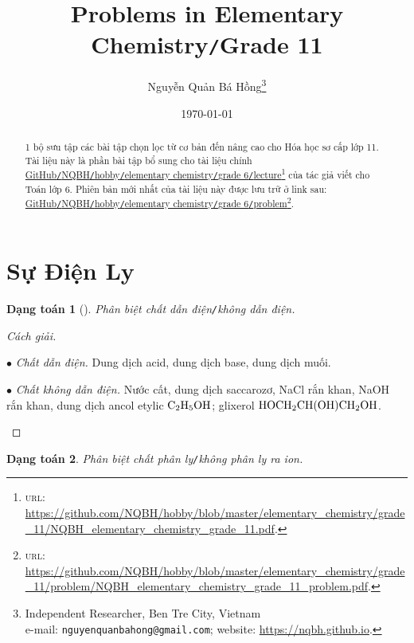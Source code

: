 \documentclass{article}
\title{Problems in Elementary Chemistry\texttt{/}Grade 11}
\author{Nguyễn Quản Bá Hồng\footnote{Independent Researcher, Ben Tre City, Vietnam\\e-mail: \texttt{nguyenquanbahong@gmail.com}; website: \url{https://nqbh.github.io}.}}
\date{\today}
\numberwithin{equation}{section}
\newtheorem{dangtoan}{Dạng toán}[section]
\begin{document}
\maketitle
\begin{abstract}
	1 bộ sưu tập các bài tập chọn lọc từ cơ bản đến nâng cao cho Hóa học sơ cấp lớp 11. Tài liệu này là phần bài tập bổ sung cho tài liệu chính \href{https://github.com/NQBH/hobby/blob/master/elementary_chemistry/grade_11/NQBH_elementary_chemistry_grade_11.pdf}{GitHub\texttt{/}NQBH\texttt{/}hobby\texttt{/}elementary chemistry\texttt{/}grade 6\texttt{/}lecture}\footnote{\textsc{url}: \url{https://github.com/NQBH/hobby/blob/master/elementary_chemistry/grade_11/NQBH_elementary_chemistry_grade_11.pdf}.} của tác giả viết cho Toán lớp 6. Phiên bản mới nhất của tài liệu này được lưu trữ ở link sau: \href{https://github.com/NQBH/hobby/blob/master/elementary_chemistry/grade_11/problem/NQBH_elementary_chemistry_grade_11_problem.pdf}{GitHub\texttt{/}NQBH\texttt{/}hobby\texttt{/}elementary chemistry\texttt{/}grade 6\texttt{/}problem}\footnote{\textsc{url}: \url{https://github.com/NQBH/hobby/blob/master/elementary_chemistry/grade_11/problem/NQBH_elementary_chemistry_grade_11_problem.pdf}.}.
\end{abstract}
\tableofcontents
\newpage


\section{Sự Điện Ly}
\begin{dangtoan}[]
	Phân biệt chất dẫn điện\emph{\texttt{/}}không dẫn điện.
\end{dangtoan}

\begin{proof}[Cách giải]
	\begin{enumerate*}
		\item[$\bullet$] \textit{Chất dẫn điện.} Dung dịch acid, dung dịch base, dung dịch muối.
		\item[$\bullet$] \textit{Chất không dẫn điện.} Nước cất, dung dịch saccarozơ, NaCl rắn khan, NaOH rắn khan, dung dịch ancol etylic $\rm C_2H_5OH$; glixerol $\rm HOCH_2CH(OH)CH_2OH$.
	\end{enumerate*}
\end{proof}

\begin{dangtoan}
	Phân biệt chất phân ly\emph{\texttt{/}}không phân ly ra ion.
\end{dangtoan}
\end{document}
